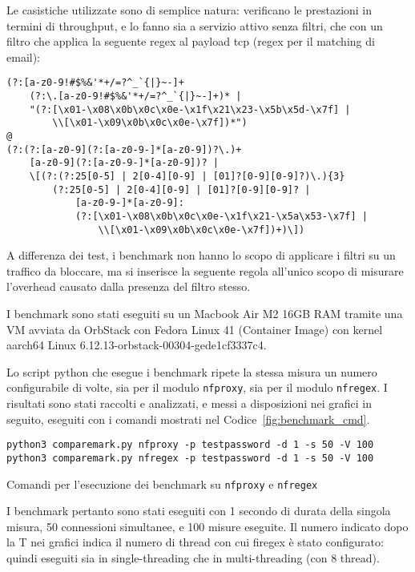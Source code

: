 Le casistiche utilizzate sono di semplice natura: verificano le prestazioni in termini di throughput, e lo fanno sia a servizio attivo senza filtri, che con un filtro che applica la seguente \gls{regex} al payload \gls{tcp} (\gls{regex} per il matching di email):
\begin{verbatim}
(?:[a-z0-9!#$%&'*+/=?^_`{|}~-]+
    (?:\.[a-z0-9!#$%&'*+/=?^_`{|}~-]+)* |
    "(?:[\x01-\x08\x0b\x0c\x0e-\x1f\x21\x23-\x5b\x5d-\x7f] |
        \\[\x01-\x09\x0b\x0c\x0e-\x7f])*")
@
(?:(?:[a-z0-9](?:[a-z0-9-]*[a-z0-9])?\.)+
    [a-z0-9](?:[a-z0-9-]*[a-z0-9])? |
    \[(?:(?:25[0-5] | 2[0-4][0-9] | [01]?[0-9][0-9]?)\.){3}
        (?:25[0-5] | 2[0-4][0-9] | [01]?[0-9][0-9]? |
            [a-z0-9-]*[a-z0-9]:
            (?:[\x01-\x08\x0b\x0c\x0e-\x1f\x21-\x5a\x53-\x7f] |
                \\[\x01-\x09\x0b\x0c\x0e-\x7f])+)\])
\end{verbatim}

A differenza dei test, i benchmark non hanno lo scopo di applicare i filtri su un traffico da bloccare, ma si inserisce la seguente regola all'unico scopo di misurare l'overhead causato dalla presenza del filtro stesso.

I benchmark sono stati eseguiti su un Macbook Air M2 16GB RAM tramite una VM avviata da OrbStack con Fedora Linux 41 (Container Image) con kernel aarch64 Linux 6.12.13-orbstack-00304-gede1cf3337c4.

Lo script python che esegue i benchmark ripete la stessa misura un numero configurabile di volte, sia per il modulo \texttt{\gls{nfproxy}}, sia per il modulo \texttt{\gls{nfregex}}.
I risultati sono stati raccolti e analizzati, e messi a disposizioni nei grafici in seguito, eseguiti con i comandi mostrati nel Codice~\ref{fig:benchmark_cmd}.
\begin{listing}[H]
\begin{verbatim}
python3 comparemark.py nfproxy -p testpassword -d 1 -s 50 -V 100
python3 comparemark.py nfregex -p testpassword -d 1 -s 50 -V 100
\end{verbatim}
\caption{Comandi per l'esecuzione dei benchmark su \texttt{nfproxy} e \texttt{nfregex}}\label{fig:benchmark_cmd}
\vspace{-1em}
\end{listing}

I benchmark pertanto sono stati eseguiti con 1 secondo di durata della singola misura, 50 connessioni simultanee, e 100 misure eseguite. Il numero indicato dopo la T nei grafici indica il numero di thread con cui firegex è stato configurato: quindi eseguiti sia in single-threading che in multi-threading (con 8 thread).

